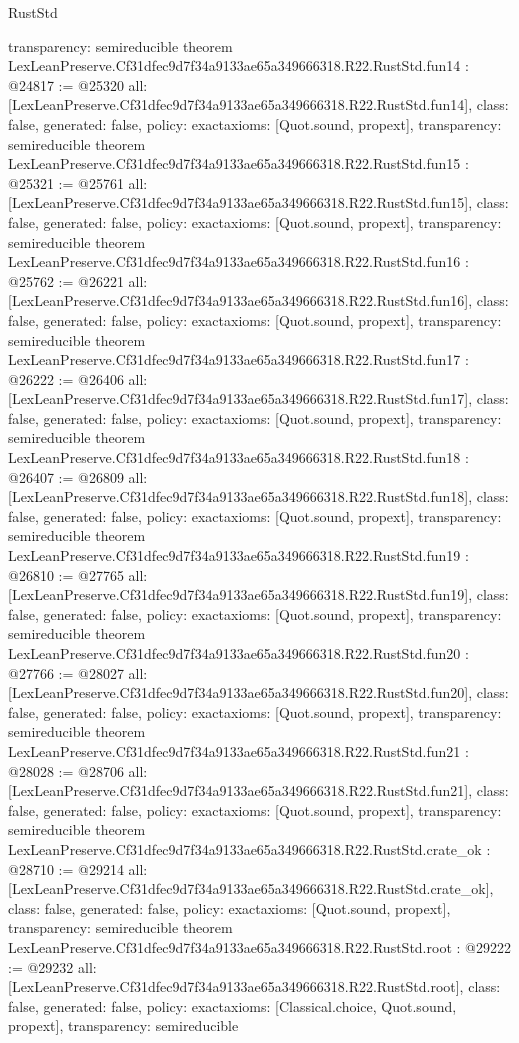 \begin{lexlean}{RustStd}
\begin{coremodule}
{  transparency: semireducible
}
theorem LexLeanPreserve.Cf31dfec9d7f34a9133ae65a349666318.R22.RustStd.fun14 : @24817 := @25320 {
  all: [LexLeanPreserve.Cf31dfec9d7f34a9133ae65a349666318.R22.RustStd.fun14],
  class: false,
  generated: false,
  policy: exact{axioms: [Quot.sound, propext]},
  transparency: semireducible
}
theorem LexLeanPreserve.Cf31dfec9d7f34a9133ae65a349666318.R22.RustStd.fun15 : @25321 := @25761 {
  all: [LexLeanPreserve.Cf31dfec9d7f34a9133ae65a349666318.R22.RustStd.fun15],
  class: false,
  generated: false,
  policy: exact{axioms: [Quot.sound, propext]},
  transparency: semireducible
}
theorem LexLeanPreserve.Cf31dfec9d7f34a9133ae65a349666318.R22.RustStd.fun16 : @25762 := @26221 {
  all: [LexLeanPreserve.Cf31dfec9d7f34a9133ae65a349666318.R22.RustStd.fun16],
  class: false,
  generated: false,
  policy: exact{axioms: [Quot.sound, propext]},
  transparency: semireducible
}
theorem LexLeanPreserve.Cf31dfec9d7f34a9133ae65a349666318.R22.RustStd.fun17 : @26222 := @26406 {
  all: [LexLeanPreserve.Cf31dfec9d7f34a9133ae65a349666318.R22.RustStd.fun17],
  class: false,
  generated: false,
  policy: exact{axioms: [Quot.sound, propext]},
  transparency: semireducible
}
theorem LexLeanPreserve.Cf31dfec9d7f34a9133ae65a349666318.R22.RustStd.fun18 : @26407 := @26809 {
  all: [LexLeanPreserve.Cf31dfec9d7f34a9133ae65a349666318.R22.RustStd.fun18],
  class: false,
  generated: false,
  policy: exact{axioms: [Quot.sound, propext]},
  transparency: semireducible
}
theorem LexLeanPreserve.Cf31dfec9d7f34a9133ae65a349666318.R22.RustStd.fun19 : @26810 := @27765 {
  all: [LexLeanPreserve.Cf31dfec9d7f34a9133ae65a349666318.R22.RustStd.fun19],
  class: false,
  generated: false,
  policy: exact{axioms: [Quot.sound, propext]},
  transparency: semireducible
}
theorem LexLeanPreserve.Cf31dfec9d7f34a9133ae65a349666318.R22.RustStd.fun20 : @27766 := @28027 {
  all: [LexLeanPreserve.Cf31dfec9d7f34a9133ae65a349666318.R22.RustStd.fun20],
  class: false,
  generated: false,
  policy: exact{axioms: [Quot.sound, propext]},
  transparency: semireducible
}
theorem LexLeanPreserve.Cf31dfec9d7f34a9133ae65a349666318.R22.RustStd.fun21 : @28028 := @28706 {
  all: [LexLeanPreserve.Cf31dfec9d7f34a9133ae65a349666318.R22.RustStd.fun21],
  class: false,
  generated: false,
  policy: exact{axioms: [Quot.sound, propext]},
  transparency: semireducible
}
theorem LexLeanPreserve.Cf31dfec9d7f34a9133ae65a349666318.R22.RustStd.crate_ok : @28710 := @29214 {
  all: [LexLeanPreserve.Cf31dfec9d7f34a9133ae65a349666318.R22.RustStd.crate_ok],
  class: false,
  generated: false,
  policy: exact{axioms: [Quot.sound, propext]},
  transparency: semireducible
}
theorem LexLeanPreserve.Cf31dfec9d7f34a9133ae65a349666318.R22.RustStd.root : @29222 := @29232 {
  all: [LexLeanPreserve.Cf31dfec9d7f34a9133ae65a349666318.R22.RustStd.root],
  class: false,
  generated: false,
  policy: exact{axioms: [Classical.choice, Quot.sound, propext]},
  transparency: semireducible
}


\end{coremodule}
\end{lexlean}
